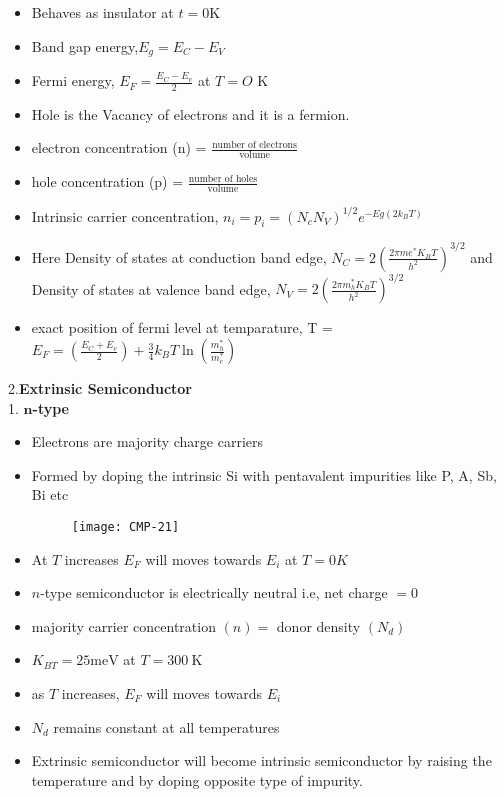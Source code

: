 \begin{itemize}
	\item Behaves as insulator at $t=$0K
	\item Band gap energy,$E_g=E_{C}-E_{V}$
	\item Fermi energy, $E_{F}=\frac{E_{C}-E_{v}}{2}$  at  $T=O$ K
	\item Hole is the Vacancy of electrons and it is a fermion.
	\item electron concentration (n) = $\frac{\text{number of electrons}}{\text{volume}}$
	\item hole concentration (p) = $\frac{\text{number of holes}}{\text{volume}}$
	\item Intrinsic carrier concentration, $n_{i}=p_{i}=\left(N_{c} N_{V}\right)^{1 / 2} e^{-E g\left(2 k_{B} T\right)}$
	\item Here Density of states at conduction band edge, $N_{C}=2\left(\frac{2 \pi m e^{*} K_{B} T}{h^{2}}\right)^{3 / 2}$ and Density of states at valence band edge, $N_{V}=2\left(\frac{2 \pi m_{h}^{*} K_{B} T}{h^{2}}\right)^{3 / 2}$
	\item exact position of fermi level at temparature, T =
	$E_{F}=\left(\frac{E_{C}+E_{v}}{2}\right)+\frac{3}{4} k_{B} T \ln \left(\frac{m_{h}^{*}}{m_{e}^{*}}\right)$
	\end{itemize}
2.\textbf{Extrinsic Semiconductor}\\
1. \textbf{$\mathbf{n}$-type}
\begin{itemize}
	\item  Electrons are majority charge carriers
	\item Formed by doping the intrinsic Si with pentavalent impurities like P, A, Sb, Bi etc
	\begin{figure}[H]
		\centering
		\texttt{[image: CMP-21]}
		\caption{}
		\label{}
	\end{figure}
	\item At $T$ increases $E_F$ will moves towards $E_i$
	at $T=0K$
	\item $n$-type semiconductor is electrically neutral i.e, net charge $=0$\\
	\item majority carrier concentration $(n)=$ donor density $\left(N_{d}\right)$\\
	\item $K_{B T}=25 \mathrm{meV}$ at $T=300 \mathrm{~K}$\\
	\item as $T$ increases, $E_F$ will moves towards $E_{i}$\\
	\item $N_{d}$ remains constant at all temperatures
	\item Extrinsic semiconductor will become intrinsic semiconductor by raising the temperature and by doping opposite type of impurity.
\end{itemize}
